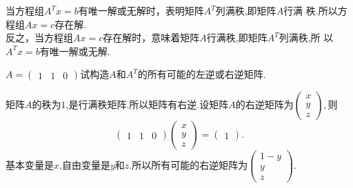 ﻿\documentclass{book} \usepackage{exsheets} \usepackage{xeCJK}
\begin{document}
\begin{solution}
  当方程组$A^Tx=b$有唯一解或无解时，表明矩阵$A^T$列满秩,即矩阵$A$行满
  秩.所以方程组$Ax=c$存在解.\\

反之，当方程组$Ax=c$存在解时，意味着矩阵$A$行满秩,即矩阵$A^T$列满秩,所
以$A^Tx=b$有唯一解或无解.
\end{solution}
\begin{question}
  $A=
  \begin{pmatrix}
    1&1&0
  \end{pmatrix}
$试构造$A$和$A^T$的所有可能的左逆或右逆矩阵.
\end{question}
\begin{solution}
 矩阵$A$的秩为$1$,是行满秩矩阵.所以矩阵有右逆.设矩阵$A$的右逆矩阵为$
 \begin{pmatrix}
   x\\
y\\
z
 \end{pmatrix},
$则
$$
\begin{pmatrix}
  1&1&0
\end{pmatrix}
\begin{pmatrix}
  x\\
y\\
z
\end{pmatrix}=
\begin{pmatrix}
  1
\end{pmatrix}.
$$
基本变量是$x$,自由变量是$y$和$z$.所以所有可能的右逆矩阵为$
\begin{pmatrix}
  1-y\\
y\\
z
\end{pmatrix}.
$

\end{solution}
\end{document}

